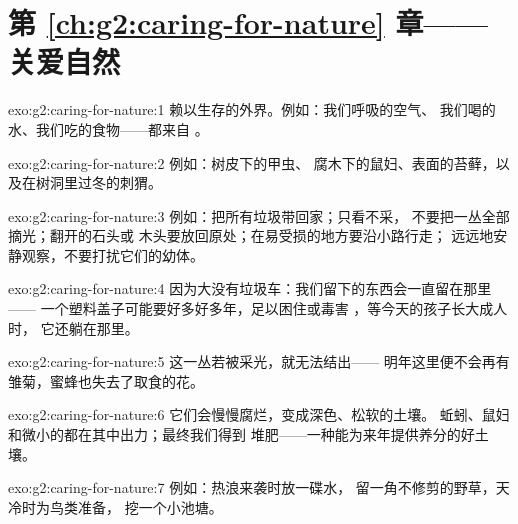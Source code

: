 \section*{第 \ref{ch:g2:caring-for-nature} 章——关爱自然}

\begin{solution}{exo:g2:caring-for-nature:1}
赖以生存的外界。例如：我们呼吸的空气、
我们喝的水、我们吃的食物——都来自
。
\end{solution}

\begin{solution}{exo:g2:caring-for-nature:2}
例如：树皮下的甲虫、
腐木下的鼠妇、表面的苔藓，以及在树洞里过冬的刺猬。
\end{solution}

\begin{solution}{exo:g2:caring-for-nature:3}
例如：把所有垃圾带回家；只看不采，
不要把一丛全部摘光；翻开的石头或
木头要放回原处；在易受损的地方要沿小路行走；
远远地安静观察，不要打扰它们的幼体。
\end{solution}

\begin{solution}{exo:g2:caring-for-nature:4}
因为大没有垃圾车：我们留下的东西会一直留在那里——
一个塑料盖子可能要好多好多年，足以困住或毒害
，等今天的孩子长大成人时，
它还躺在那里。
\end{solution}

\begin{solution}{exo:g2:caring-for-nature:5}
这一丛若被采光，就无法结出——
明年这里便不会再有雏菊，蜜蜂也失去了取食的花。
\end{solution}

\begin{solution}{exo:g2:caring-for-nature:6}
它们会慢慢腐烂，变成深色、松软的土壤。
蚯蚓、鼠妇和微小的都在其中出力；最终我们得到
堆肥——一种能为来年提供养分的好土壤。
\end{solution}

\begin{solution}{exo:g2:caring-for-nature:7}
例如：热浪来袭时放一碟水，
留一角不修剪的野草，天冷时为鸟类准备，
挖一个小池塘。
\end{solution}

